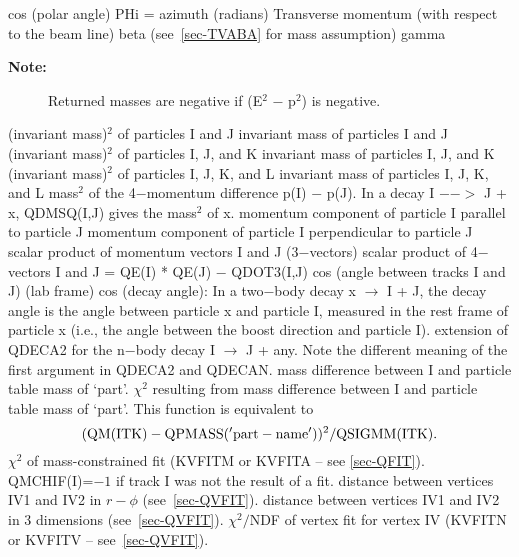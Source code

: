 \begin{indentlist}{ 3.25cm}{ 3.50cm}
cos (polar angle)
PHi = azimuth (radians)
Transverse momentum (with respect to the beam
line)
beta (see~\ref{sec-TVABA} for mass assumption)
gamma
\end{indentlist}
\begin{description}
\item[\bf{Note:}]Returned masses are negative
if (E$^2$ $-$ p$^2$) is negative.
\end{description}
\begin{indentlist}{ 3.25cm}{ 3.50cm}
(invariant mass)$^2$ of particles I and J
invariant mass of particles I and J
(invariant mass)$^2$ of particles I, J, and
K
invariant mass of particles I, J, and K
(invariant mass)$^2$ of particles I, J,
K, and L
invariant mass of particles I, J, K, and
L
mass$^2$ of the 4$-$momentum difference p(I)
$-$ p(J).
In a decay I $-$$-$$>$ J + x, QDMSQ(I,J) gives the mass$^2$ of x.
momentum component of particle I parallel
to particle J
momentum component of particle I perpendicular
to particle J
scalar product of momentum vectors I and J
(3$-$vectors)
scalar product of 4$-$vectors I and J
= QE(I) * QE(J) $-$ QDOT3(I,J)
cos (angle between tracks I and J) (lab frame)
cos (decay angle):
In a two$-$body decay x $\rightarrow$ I + J, the decay angle is the
angle between particle x and particle I, measured in the
rest frame of particle x (i.e., the angle
between the boost direction and particle I).
extension of QDECA2 for the n$-$body decay
I $\rightarrow$ J + any.
Note the different meaning of the first argument in
QDECA2 and QDECAN.
mass difference between I and particle
table
mass of `part'.
$\chi^2$ resulting from mass difference
between
I and particle table mass of `part'. This function is equivalent
to
$$({\rm QM(ITK)}- {\rm QPMASS('part-name'}))^2 / {\rm QSIGMM(ITK)}.$$
$\chi^2$ of mass-constrained
fit (KVFITM or KVFITA --
see \ref{sec-QFIT}). QMCHIF(I)=$-1$ if
track I was not the result of a fit.
distance between vertices IV1 and IV2
in $r-\phi$ (see~\ref{sec-QVFIT}).
distance between vertices IV1 and IV2
in 3 dimensions (see~\ref{sec-QVFIT}).
$\chi^2/$NDF of vertex fit for vertex IV
(KVFITN or KVFITV -- see~\ref{sec-QVFIT}).
 
\end{indentlist}
